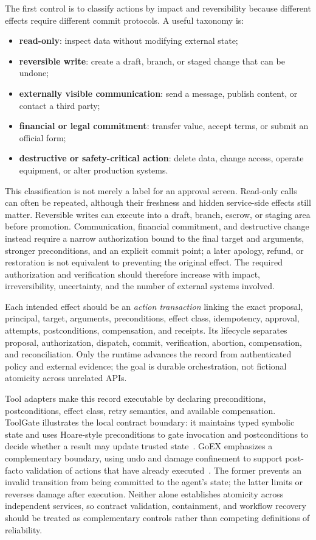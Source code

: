 The first control is to classify actions by impact and reversibility because different effects require different commit protocols. A useful taxonomy is:
\begin{itemize}
    \item \textbf{read-only}: inspect data without modifying external state;
    \item \textbf{reversible write}: create a draft, branch, or staged change that can be undone;
    \item \textbf{externally visible communication}: send a message, publish content, or contact a third party;
    \item \textbf{financial or legal commitment}: transfer value, accept terms, or submit an official form;
    \item \textbf{destructive or safety-critical action}: delete data, change access, operate equipment, or alter production systems.
\end{itemize}
This classification is not merely a label for an approval screen. Read-only calls can often be repeated, although their freshness and hidden service-side effects still matter. Reversible writes can execute into a draft, branch, escrow, or staging area before promotion. Communication, financial commitment, and destructive change instead require a narrow authorization bound to the final target and arguments, stronger preconditions, and an explicit commit point; a later apology, refund, or restoration is not equivalent to preventing the original effect. The required authorization and verification should therefore increase with impact, irreversibility, uncertainty, and the number of external systems involved.

Each intended effect should be an \emph{action transaction} linking the exact proposal, principal, target, arguments, preconditions, effect class, idempotency, approval, attempts, postconditions, compensation, and receipts. Its lifecycle separates proposal, authorization, dispatch, commit, verification, abortion, compensation, and reconciliation. Only the runtime advances the record from authenticated policy and external evidence; the goal is durable orchestration, not fictional atomicity across unrelated APIs.

Tool adapters make this record executable by declaring preconditions, postconditions, effect class, retry semantics, and available compensation. ToolGate illustrates the local contract boundary: it maintains typed symbolic state and uses Hoare-style preconditions to gate invocation and postconditions to decide whether a result may update trusted state~\cite{liu2026toolgate}. GoEX emphasizes a complementary boundary, using undo and damage confinement to support post-facto validation of actions that have already executed~\cite{patil2024goex}. The former prevents an invalid transition from being committed to the agent's state; the latter limits or reverses damage after execution. Neither alone establishes atomicity across independent services, so contract validation, containment, and workflow recovery should be treated as complementary controls rather than competing definitions of reliability.

